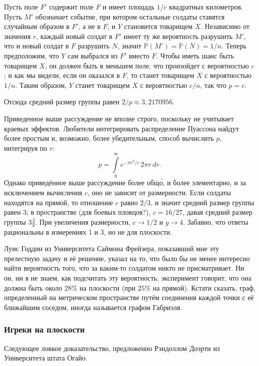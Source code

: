 Пусть поле $F'$ содержит поле $F$ и имеет площадь $1/c$ квадратных километров.
Пусть $M'$ обозначает событие, при котором остальные солдаты ставятся случайным образом в $F'$, а не в $F$, и $Y$ становится товарищем $X$.
Независимо от значения $r$, каждый новый солдат в $F'$ имеет ту же вероятность разрушить $M'$, что и новый солдат в $F$ разрушить $N$, значит $\mathbb{P}(M')= \mathbb{P}(N) = 1/n$.
Теперь предположим, что $Y$ сам выбрался из $F'$ вместо $F$.
Чтобы иметь шанс быть товарищем $X$, он должен быть в меньшем поле, что произойдет с вероятностью $c$; и как мы видели, если он оказался в $F$, то станет товарищем $X$ с вероятностью $1/n$.
Таким образом, $Y$ станет товарищем $X$ с вероятностью $c/n$, так что $p=c$.

Отсюда средний размер группы равен $2/p\approx3{,}2170956$.
\heart

Приведенное выше рассуждение не вполне строго, поскольку не учитывает краевых эффектов.
Любители интегрировать распределение Пуассона %
найдут более простым и, возможно, более убедительным, способ вычислить $p$, интегрируя по $r$:
\[p=\int\limits_0^\infty e^{-\pi r^2/c}\,2\pi r\, dr.\] %
Однако приведённое выше рассуждение более общ\'{о}, и более элементарно, и за исключением вычисления $c$, оно не зависит от размерности.
Если солдаты находятся на прямой, то отношение $c$ равно $2/3$, и значит средний размер группы равен 3;
в пространстве (для боевых пловцов?), $c = 16/27$, давая средний размер группы $3\tfrac38$.
При увеличения размерности, $c\to 1/2$ и $g\to 4$. 
Забавно, что ответы рациональны в измерениях 1 и 3, но не для плоскости.

Луис Годдин из Университета Саймона Фрейзера, показавший мне эту прелестную задачу и её решение, указал на то, что было бы не менее интересно найти вероятность того, что за каким-то солдатом никто не присматривает.
Ни он, ни я не знаем, как подсчитать эту вероятность; эксперимент говорит, что она должна быть около $28\%$ на плоскости (при $25\%$ на прямой).
Кстати сказать, граф, определенный на метрическом пространстве путём соединения каждой точки с её ближайшим соседом, иногда называется графом Габриэля.

\subsubsection*{Игреки на плоскости}

Следующее ловкое  доказательство, предложенно Рэндоллом Доэрти из Университета штата Огайо.

